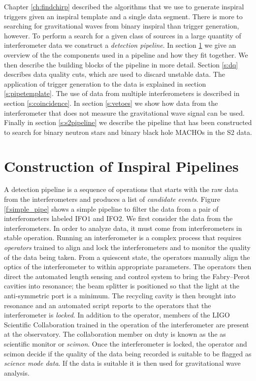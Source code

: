 
Chapter \ref{ch:findchirp} described the algorithms that we use to generate
inspiral triggers given an inspiral template and a single data segment.
There is more to searching for gravitational waves from binary inspiral than
trigger generation, however. To perform a search for a given class of sources in a
large quantity of interferometer data we construct a \emph{detection
pipeline}.  In section \ref{s:construction} we give an overview of the
the components used in a pipeline and how they fit together.
We then describe the building blocks of the pipeline in more detail. Section
\ref{s:dq} describes data quality cuts, which are used to discard unstable
data. The application of trigger generation to the data is explained in
section \ref{s:pipetemplate}. The use of data from multiple interferometers is
described in section \ref{s:coincidence}. In section \ref{s:vetoes} we
show how data from the interferometer that does not measure the gravitational
wave signal can be used.  Finally in section \ref{s:s2pipeline} we describe
the pipeline that has been constructed to search for binary neutron stars and
binary black hole MACHOs in the S2 data.

\section{Construction of Inspiral Pipelines}
\label{s:construction}

A detection pipeline is a sequence of operations that starts with the raw data
from the interferometers and produces a list of \emph{candidate events}.
Figure \ref{f:simple_pipe} shows a simple pipeline to filter the data from a
pair of interferometers labeled IFO$1$ and IFO$2$.
We first consider the data from the interferometers. In order to analyze
data, it must come from interferometers in stable operation. Running an
interferometer is a complex process that requires \emph{operators} trained to
align and lock the interferometers and to monitor the quality of the data
being taken. From a quiescent state, the operators manually align the optics
of the interferometer to within appropriate parameters. The operators then
direct the automated length sensing and control system to bring the
Fabry--Perot cavities into resonance; the beam splitter is positioned so that
the light at the anti-symmetric port is a minimum. The recycling cavity is
then brought into resonance and an automated script reports to the operators
that the interferometer is \emph{locked}. In addition to the operator, 
members of the LIGO Scientific Collaboration trained in the operation
of the interferometer are present at the observatory. The collaboration member
on duty is known as the as scientific monitor or \emph{scimon}. Once the
interferometer is locked, the operator and scimon decide if the quality of the
data being recorded is suitable to be flagged as \emph{science mode data}. If 
the data is suitable it is then used for gravitational wave analysis.


